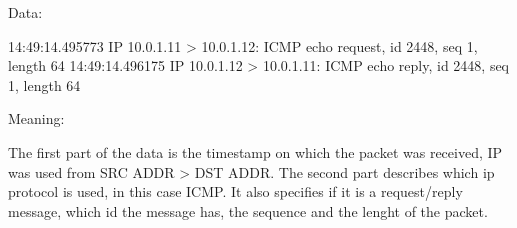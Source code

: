 Data:

14:49:14.495773 IP 10.0.1.11 > 10.0.1.12: ICMP echo request, id 2448, seq 1, length 64
14:49:14.496175 IP 10.0.1.12 > 10.0.1.11: ICMP echo reply, id 2448, seq 1, length 64

Meaning:

The first part of the data is the timestamp on which the packet was received, IP was used from SRC ADDR > DST ADDR. The second part describes which ip protocol is used, in this case ICMP. It also specifies if it is a request/reply message, which id the message has, the sequence and the lenght of the packet.